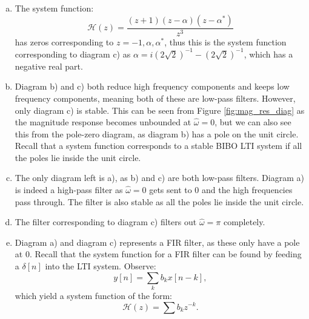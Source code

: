 \begin{enumerate}
\begin{enumerate}[a)]
\item The system function:
$$\mathcal{H}(z)=\frac{(z+1)(z-\alpha)(z-\alpha^{*})}{z^{3}}$$
has zeros corresponding to $z=-1,\alpha,\alpha^{*}$, thus this is the system function corresponding to diagram c) as $\alpha=i(2\sqrt{2})^{-1}-(2\sqrt{2})^{-1}$, which has a negative real part. 
\item Diagram b) and c) both reduce high frequency components and keeps low frequency components, meaning both of these are low-pass filters. However, only diagram c) is stable. This can be seen from Figure \ref{fig:mag_res_diag} as the magnitude response becomes unbounded at $\hat{\omega}=0$, but we can also see this from the pole-zero diagram, as diagram b) has a pole on the unit circle. Recall that a system function corresponds to a stable BIBO LTI system if all the poles lie inside the unit circle. 

\item The only diagram left is a), as b) and c) are both low-pass filters. Diagram a) is indeed a high-pass filter as $\hat{\omega}=0$ gets sent to $0$ and the high frequencies pass through. The filter is also stable as all the poles lie inside the unit circle. 

\item The filter corresponding to diagram c) filters out $\hat{\omega}=\pi$ completely. 

\item Diagram a) and diagram c) represents a FIR filter, as these only have a pole at $0$. Recall that the system function for a 
FIR filter can be found by feeding a $\delta[n]$ into the LTI system. Observe:
$$y[n]=\sum_k b_kx[n-k],$$
which yield a system function of the form:
$$\mathcal{H}(z)=\sum b_{k}z^{-k}.$$

\end{enumerate}
\end{enumerate}

